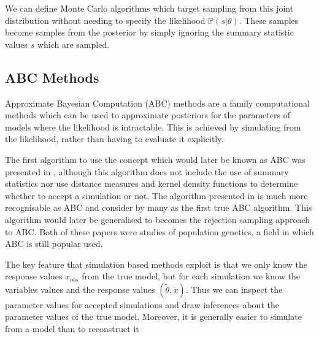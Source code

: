 \documentclass[11pt,a4paper]{article}
\newcommand*{\prob}{\mathbb{P}}
\theoremstyle{break}
\begin{document}
  We can define Monte Carlo algorithms which target sampling from this joint distribution without needing to specify the likelihood $\prob(s|\theta)$. These samples become samples from the posterior by simply ignoring the summary statistic values $s$ which are sampled.

\subsection{ABC Methods}\label{sec_ABC_ABC_methods}


  \par Approximate Bayesian Computation (ABC) methods are a family computational methods which can be used to approximate posteriors for the parameters of models where the likelihood is intractable. This is achieved by simulating from the likelihood, rather than having to evaluate it explicitly.

  \par The first algorithm to use the concept which would later be known as ABC was presented in \cite[]{inferring_coalescence_times_from_dna_sequence_data}, although this algorithm does not include the use of summary statistics nor use distance measures and kernel density functions to determine whether to accept a simulation or not. The algorithm presented in \cite[]{population_growth_of_human_Y_chromosomes} is much more recognisable as ABC and consider by many as the first true ABC algorithm. This algorithm would later be generalised to becomes the rejection sampling approach to ABC. Both of these papers were studies of population genetics, a field in which ABC is still popular used.

  \par The key feature that simulation based methods exploit is that we only know the response values $x_{obs}$ from the true model, but for each simulation we know the variables values and the response values $(\tilde\theta,\tilde{x})$. Thus we can inspect the parameter values for accepted simulations and draw inferences about the parameter values of the true model. Moreover, it is generally easier to simulate from a model than to reconstruct it
\end{document}
